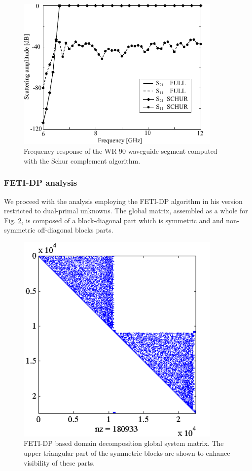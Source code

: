 \begin{figure}[ht!]
\centering
\includegraphics[width=10cm]{WRfreqSchur}
\caption{Frequency response of the WR-90 waveguide segment computed with the Schur complement algorithm.}
\label{fig:WRfreqSchur}
\end{figure}

\clearpage
\subsubsection{FETI-DP analysis}

We proceed with the analysis employing the FETI-DP algorithm in his version restricted to dual-primal unknowns. The global matrix, assembled as a whole for Fig. \ref{fig:DDFETIMat}, is composed of a block-diagonal part which is symmetric and and non-symmetric off-diagonal blocks parts.

\begin{figure}[ht!]
\centering
\includegraphics[width=10cm]{DDFETIMat}
\caption{FETI-DP based domain decomposition global system matrix. The upper triangular part of the symmetric blocks are  shown to enhance visibility of these parts. }
\label{fig:DDFETIMat}
\end{figure}

